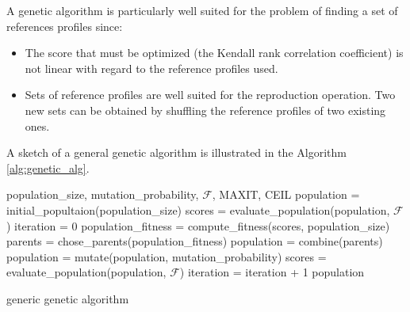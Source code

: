 A genetic algorithm is particularly well suited for the problem of finding a set of references profiles since:
\begin{itemize}
    \item The score that must be optimized (the Kendall rank correlation coefficient) is not linear with regard to the reference profiles used.
    \item Sets of reference profiles are well suited for the reproduction operation. Two new sets can be obtained by shuffling the reference profiles of two existing ones.
\end{itemize}
A sketch of a general genetic algorithm is illustrated in the Algorithm \ref{alg:genetic_alg}.
\begin{algorithm}[h]
\begin{algorithmic}[1]
    \REQUIRE population\_size, mutation\_probability, $\mathcal{F}$, MAXIT, CEIL
    \STATE population = initial\_popultaion(population\_size)
    \STATE scores = evaluate\_population(population, $\mathcal{F}$)
    \STATE iteration = 0
        \STATE population\_fitness = compute\_fitness(scores, population\_size)
        \STATE parents = chose\_parents(population\_fitness)
        \STATE population = combine(parents)
        \STATE population = mutate(population, mutation\_probability)
        \STATE scores = evaluate\_population(population, $\mathcal{F}$)
        \STATE iteration = iteration + 1
    \ENDWHILE
    \RETURN population
\end{algorithmic}
\caption{generic genetic algorithm}
\label{alg:genetic_alg}
\end{algorithm}


